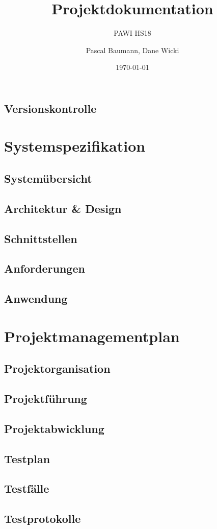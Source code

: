 \documentclass[a4paper]{scrreprt}
\title{Projektdokumentation}
\subtitle{PAWI HS18}
\author{Pascal Baumann, Dane Wicki}
\date{\today}
\begin{document}
\begin{titlepage}
\maketitle
\end{titlepage}

\section*{Versionskontrolle}

\tableofcontents

\chapter{Systemspezifikation}

\section{Systemübersicht}

\section{Architektur \& Design}

\section{Schnittstellen}

\section{Anforderungen}

\section{Anwendung}

\chapter{Projektmanagementplan}

\section{Projektorganisation}

\section{Projektführung}

\section{Projektabwicklung}

\section{Testplan}

\section{Testfälle}

\section{Testprotokolle}


\appendix
\end{document}
